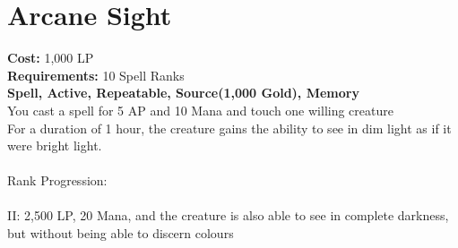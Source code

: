\section{Arcane Sight}\label{spell:arcaneSight}
\textbf{Cost:} 1,000 LP\\
\textbf{Requirements:} 10 Spell Ranks\\
\textbf{Spell, Active, Repeatable, Source(1,000 Gold), Memory}\\
You cast a spell for 5 AP and 10 Mana and touch one willing creature\\
For a duration of 1 hour, the creature gains the ability to see in dim light as if it were bright light.\\
\\
Rank Progression:\\
\\
II: 2,500 LP, 20 Mana, and the creature is also able to see in complete darkness, but without being able to discern colours\\